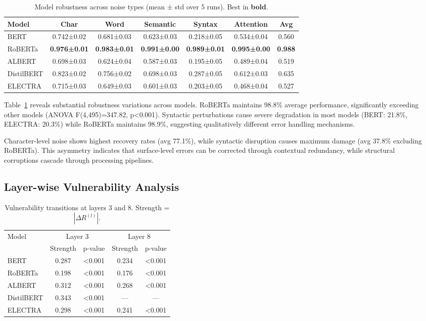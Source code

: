 \begin{table}[t]
\centering
\caption{Model robustness across noise types (mean ± std over 5 runs). Best in \textbf{bold}.}
\label{tab:main_results}
\begin{tabular}{l|ccccc|c}
\toprule
Model & Char & Word & Semantic & Syntax & Attention & Avg \\
\midrule
BERT & 0.742±0.02 & 0.681±0.03 & 0.623±0.03 & 0.218±0.05 & 0.534±0.04 & 0.560 \\
RoBERTa & \textbf{0.976±0.01} & \textbf{0.983±0.01} & \textbf{0.991±0.00} & \textbf{0.989±0.01} & \textbf{0.995±0.00} & \textbf{0.988} \\
ALBERT & 0.698±0.03 & 0.624±0.04 & 0.587±0.03 & 0.195±0.05 & 0.489±0.04 & 0.519 \\
DistilBERT & 0.823±0.02 & 0.756±0.02 & 0.698±0.03 & 0.287±0.05 & 0.612±0.03 & 0.635 \\
ELECTRA & 0.715±0.03 & 0.649±0.03 & 0.601±0.03 & 0.203±0.05 & 0.468±0.04 & 0.527 \\
\bottomrule
\end{tabular}
\end{table}

Table~\ref{tab:main_results} reveals substantial robustness variations across models. RoBERTa maintains 98.8\% average performance, significantly exceeding other models (ANOVA F(4,495)=347.82, p<0.001). Syntactic perturbations cause severe degradation in most models (BERT: 21.8\%, ELECTRA: 20.3\%) while RoBERTa maintains 98.9\%, suggesting qualitatively different error handling mechanisms.

Character-level noise shows highest recovery rates (avg 77.1\%), while syntactic disruption causes maximum damage (avg 37.8\% excluding RoBERTa). This asymmetry indicates that surface-level errors can be corrected through contextual redundancy, while structural corruptions cascade through processing pipelines.

\subsection{Layer-wise Vulnerability Analysis}

\begin{table}[t]
\centering
\caption{Vulnerability transitions at layers 3 and 8. Strength = $|\Delta R^{(l)}|$.}
\label{tab:transitions}
\begin{tabular}{l|cc|cc}
\toprule
Model & \multicolumn{2}{c|}{Layer 3} & \multicolumn{2}{c}{Layer 8} \\
 & Strength & p-value & Strength & p-value \\
\midrule
BERT & 0.287 & <0.001 & 0.234 & <0.001 \\
RoBERTa & 0.198 & <0.001 & 0.176 & <0.001 \\
ALBERT & 0.312 & <0.001 & 0.268 & <0.001 \\
DistilBERT & 0.343 & <0.001 & --- & --- \\
ELECTRA & 0.298 & <0.001 & 0.241 & <0.001 \\
\bottomrule
\end{tabular}
\end{table}

